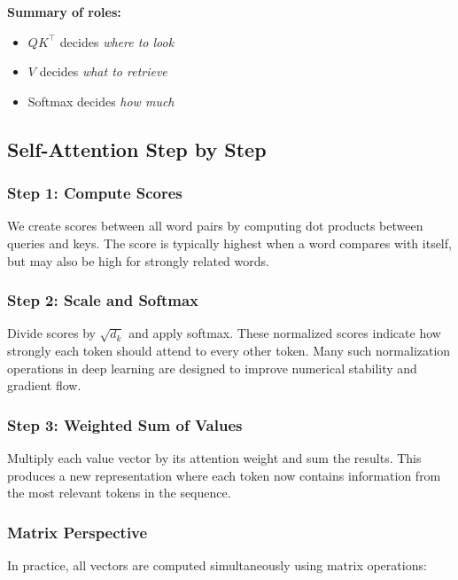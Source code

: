 \documentclass[11pt]{article}
\begin{document}
\noindent\textbf{Summary of roles:}

\begin{itemize}[nosep]

\item $QK^\top$ decides \emph{where to look}
\item $V$ decides \emph{what to retrieve}
\item Softmax decides \emph{how much}

\end{itemize}

\subsection{Self-Attention Step by Step}

\subsubsection{Step 1: Compute Scores}

We create scores between all word pairs by computing dot products between queries and keys. The score is typically highest when a word compares with itself, but may also be high for strongly related words.

\subsubsection{Step 2: Scale and Softmax}

Divide scores by $\sqrt{d_k}$ and apply softmax. These normalized scores indicate how strongly each token should attend to every other token. Many such normalization operations in deep learning are designed to improve numerical stability and gradient flow.

\subsubsection{Step 3: Weighted Sum of Values}

Multiply each value vector by its attention weight and sum the results. This produces a new representation where each token now contains information from the most relevant tokens in the sequence.

\subsubsection{Matrix Perspective}

In practice, all vectors are computed simultaneously using matrix operations:
\end{document}
